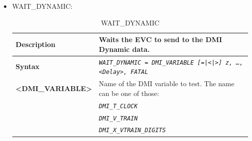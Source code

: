\begin{itemize}
	\item WAIT\_DYNAMIC:

			\begin{longtable}{|l|l|}
			\caption{WAIT\_DYNAMIC}\\
				\hline

					\begin{minipage}[t]{0.22\linewidth} \textbf{Description} \end{minipage}
				&	\begin{minipage}[t]{0.78\linewidth} Waits the EVC to send to the DMI Dynamic data. \end{minipage} \\

				\hline

					\begin{minipage}[t]{0.22\linewidth} \textbf{Syntax}	\end{minipage}
				&	\begin{minipage}[t]{0.78\linewidth} \emph{\texttt{WAIT\_DYNAMIC = DMI\_VARIABLE [=|<|>] z,  …, <Delay>, FATAL}} \end{minipage} \\

				\hline

					\multirow{1}{*}{ \begin{minipage}[t]{0.22\linewidth} \textbf{<DMI\_VARIABLE>}	\end{minipage} }
				&	\begin{minipage}[t]{0.78\linewidth} Name of the DMI variable to test. The name can be one of those:\end{minipage} \\

				\hline

				&	\begin{minipage}[t]{0.78\linewidth} \emph{\texttt{DMI\_T\_CLOCK}} \end{minipage} \\

				\hline

				&	\begin{minipage}[t]{0.78\linewidth} \emph{\texttt{DMI\_V\_TRAIN}} \end{minipage} \\

				\hline

				&	\begin{minipage}[t]{0.78\linewidth} \emph{\texttt{DMI\_X\_VTRAIN\_DIGITS}} \end{minipage} \\


\end{longtable}
\end{itemize}
